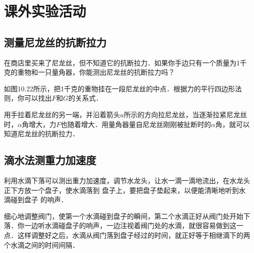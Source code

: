 
	

\chapter{课外实验活动}

\setcounter{section}{0}
\section{测量尼龙丝的抗断拉力}
在商店里买来了尼龙丝，但不知道它的抗断拉力．如果你手边只有一个质量为1千克的重物和一只量角器，你能测出尼龙丝的抗断拉力吗？

如图10.22所示，把1千克的重物挂在一段尼龙丝的中点．根据力的平行四边形法则，你可以找出$F$和$G$的关系式．

用手拉着尼龙丝的另一端，并沿着箭头$a$所示的方向拉尼龙丝，当逐渐拉紧尼龙丝时，$\alpha$角增大，力$F$也随着增大．用量角器量自尼龙丝刚刚被扯断时的$\alpha$角，就可以知道尼龙丝的抗断拉力．

\begin{figure}[htp]\centering
    \caption{}
\end{figure}

\section{滴水法测重力加速度}

利用水滴下落可以测出重力加速度，调节水龙头，让水一滴一滴地流出，在水龙头正下方放一个盘子，使水滴落到
盘子上，要把盘子垫起来，以便能清晰地听到水滴碰到盘子
的响声．

细心地调整阀门，使第一个水滴碰到盘子的瞬间，第二个水滴正好从阀门处开始下落．你一边听水滴碰盘子的响声，一边注视着阀门处的水滴，就很容易做到这一点．这样调整好之后，水滴从阀门落到盘子经过的时间，就正好等于相继滴下的两个水滴之间的时间间隔．

